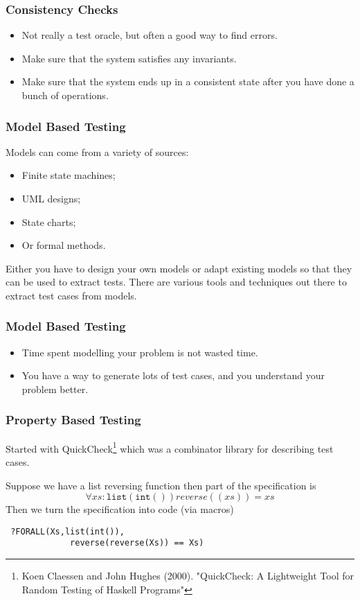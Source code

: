 \documentclass{beamer}
\begin{document}
\begin{frame}
  \frametitle{Consistency Checks}

  \begin{itemize}
  \item   Not really a test oracle, but often a good way to find errors.
  \item Make sure that the system satisfies any invariants.
  \item Make sure that the system ends up in a consistent state after you have
    done a bunch of operations.
  \end{itemize}
\end{frame}
\begin{frame}
  \frametitle{Model Based Testing}

  Models can come from a variety of sources:
  \begin{itemize}
  \item Finite state machines;
  \item UML designs;
  \item State charts;
  \item Or formal methods.
  \end{itemize}
  Either you have to design your own models or adapt existing models so that
  they can be used to extract tests. There are various tools and techniques
  out there to extract test cases from models.
  
\end{frame}
\begin{frame}
  \frametitle{Model Based Testing}
  \begin{itemize}
  \item Time spent modelling your problem is not wasted time.
  \item You have a way to generate lots of test cases, and you understand your
    problem better.
  \end{itemize}
\end{frame}
\begin{frame}[fragile]
  \frametitle{Property Based Testing}
Started with QuickCheck\footnote{Koen Claessen and John Hughes
  (2000). "QuickCheck: A Lightweight Tool for Random Testing of Haskell
  Programs"} which was a combinator library for describing test cases.


Suppose we have a list reversing function then part of the  specification is
\[
  \forall xs:\mathtt{list(int())} reverse((xs))=xs
\]
Then we turn the specification into code (via macros)
\begin{verbatim}
 ?FORALL(Xs,list(int()),
             reverse(reverse(Xs)) == Xs)
\end{verbatim}

\end{frame}
\end{document}
